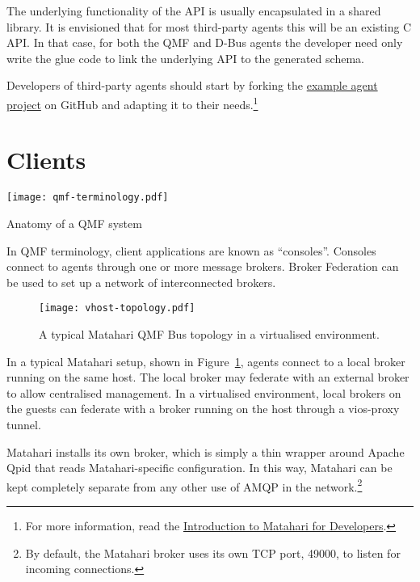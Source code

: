\documentclass{tufte-handout}
\begin{document}
The underlying functionality of the API is usually encapsulated in a shared library. It is envisioned that for most third-party agents this will be an existing C API. In that case, for both the QMF and D-Bus agents the developer need only write the glue code to link the underlying API to the generated schema.

Developers of third-party agents should start by forking the \href{https://github.com/matahari/matahari-agent-example}{example agent project} on GitHub and adapting it to their needs.\footnote{For more information, read the \href{https://github.com/downloads/zaneb/presentations/matahari-for-developers-7db27de.pdf}{Introduction to Matahari for Developers}.}

\section{Clients}

\begin{marginfigure}
\texttt{[image: qmf-terminology.pdf]}
\caption{Anatomy of a QMF system}
\label{fig:qmf-terminology}
\end{marginfigure}

In QMF terminology, client applications are known as ``consoles''. Consoles connect to agents through one or more message brokers. Broker Federation can be used to set up a network of interconnected brokers.

\begin{figure}[b!]
\texttt{[image: vhost-topology.pdf]}
\caption{A typical Matahari QMF Bus topology in a virtualised environment.}
\label{fig:vhost-topology}
\end{figure}

In a typical Matahari setup, shown in Figure~\ref{fig:vhost-topology}, agents connect to a local broker running on the same host. The local broker may federate with an external broker to allow centralised management. In a virtualised environment, local brokers on the guests can federate with a broker running on the host through a  vios-proxy tunnel.
 
Matahari installs its own broker, which is simply a thin wrapper around Apache Qpid that reads Matahari-specific configuration. In this way, Matahari can be kept completely separate from any other use of AMQP in the network.\footnote{By default, the Matahari broker uses its own TCP port, 49000, to listen for incoming connections.}
\end{document}
